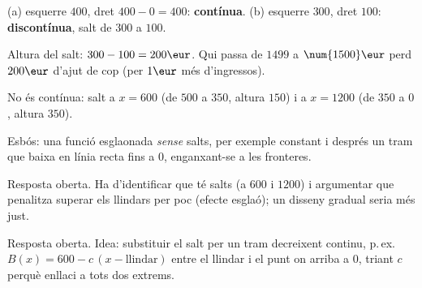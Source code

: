\begin{solucions}
\begin{sollist}
  \item (a) esquerre $400$, dret $400-0=400$: \textbf{contínua}. \quad
        (b) esquerre $300$, dret $100$: \textbf{discontínua}, salt de $300$ a $100$.
  \item Altura del salt: $300-100=200\eur$. Qui passa de $\num{1499}$ a $\num{1500}\eur$
        perd $200\eur$ d'ajut de cop (per $1\eur$ més d'ingressos).
  \item No és contínua: salt a $x=600$ (de $500$ a $350$, altura $150$) i a $x=1200$
        (de $350$ a $0$, altura $350$).
  \item Esbós: una funció esglaonada \emph{sense} salts, per exemple constant i després
        un tram que baixa en línia recta fins a $0$, enganxant-se a les fronteres.
  \item Resposta oberta. Ha d'identificar que té salts (a $600$ i $1200$) i argumentar
        que penalitza superar els llindars per poc (efecte esglaó); un disseny gradual
        seria més just.
  \item Resposta oberta. Idea: substituir el salt per un tram decreixent continu, p.\,ex.
        $B(x)=600-c\,(x-\text{llindar})$ entre el llindar i el punt on arriba a $0$,
        triant $c$ perquè enllaci a tots dos extrems.
\end{sollist}
\end{solucions}
